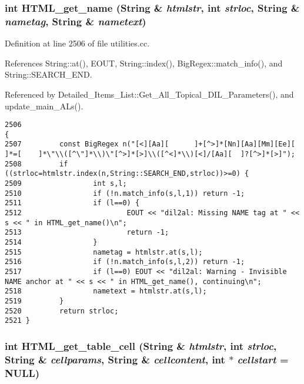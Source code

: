 \subsubsection{\setlength{\rightskip}{0pt plus 5cm}int HTML\_\-get\_\-name ({\bf String} \& {\em htmlstr}, int {\em strloc}, {\bf String} \& {\em nametag}, {\bf String} \& {\em nametext})}\label{utilities_8cc_a59}




Definition at line 2506 of file utilities.cc.

References String::at(), EOUT, String::index(), Big\-Regex::match\_\-info(), and String::SEARCH\_\-END.

Referenced by Detailed\_\-Items\_\-List::Get\_\-All\_\-Topical\_\-DIL\_\-Parameters(), and update\_\-main\_\-ALs().



\footnotesize\begin{verbatim}2506                                                                                      {
2507         const BigRegex n("[<][Aa][      ]+[^>]*[Nn][Aa][Mm][Ee][        ]*=[    ]*\"\\([^\"]*\\)\"[^>]*[>]\\([^<]*\\)[<]/[Aa][  ]?[^>]*[>]");
2508         if ((strloc=htmlstr.index(n,String::SEARCH_END,strloc))>=0) {
2509                 int s,l;
2510                 if (!n.match_info(s,l,1)) return -1;
2511                 if (l==0) {
2512                         EOUT << "dil2al: Missing NAME tag at " << s << " in HTML_get_name()\n";
2513                         return -1;
2514                 }
2515                 nametag = htmlstr.at(s,l);
2516                 if (!n.match_info(s,l,2)) return -1;
2517                 if (l==0) EOUT << "dil2al: Warning - Invisible NAME anchor at " << s << " in HTML_get_name(), continuing\n";
2518                 nametext = htmlstr.at(s,l);
2519         }
2520         return strloc;
2521 }
\end{verbatim}\normalsize 
{}
\subsubsection{\setlength{\rightskip}{0pt plus 5cm}int HTML\_\-get\_\-table\_\-cell ({\bf String} \& {\em htmlstr}, int {\em strloc}, {\bf String} \& {\em cellparams}, {\bf String} \& {\em cellcontent}, int $\ast$ {\em cellstart} = NULL)}\label{utilities_8cc_a54}




